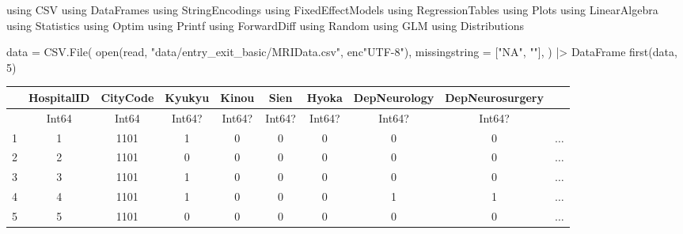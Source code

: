 \documentclass[
  letterpaper,
  DIV=11,
  numbers=noendperiod]{scrreprt}
\newenvironment{Shaded}{\begin{snugshade}}{\end{snugshade}}
\newcommand{\BuiltInTok}[1]{\textcolor[rgb]{0.00,0.23,0.31}{#1}}
\newcommand{\FloatTok}[1]{\textcolor[rgb]{0.68,0.00,0.00}{#1}}
\newcommand{\FunctionTok}[1]{\textcolor[rgb]{0.28,0.35,0.67}{#1}}
\newcommand{\ImportTok}[1]{\textcolor[rgb]{0.00,0.46,0.62}{#1}}
\newcommand{\NormalTok}[1]{\textcolor[rgb]{0.00,0.23,0.31}{#1}}
\newcommand{\OperatorTok}[1]{\textcolor[rgb]{0.37,0.37,0.37}{#1}}
\newcommand{\StringTok}[1]{\textcolor[rgb]{0.13,0.47,0.30}{#1}}
\begin{document}
\begin{Shaded}
\begin{Highlighting}[]
\ImportTok{using} \BuiltInTok{CSV}
\ImportTok{using} \BuiltInTok{DataFrames}
\ImportTok{using} \BuiltInTok{StringEncodings}
\ImportTok{using} \BuiltInTok{FixedEffectModels}
\ImportTok{using} \BuiltInTok{RegressionTables}
\ImportTok{using} \BuiltInTok{Plots}
\ImportTok{using} \BuiltInTok{LinearAlgebra}
\ImportTok{using} \BuiltInTok{Statistics}
\ImportTok{using} \BuiltInTok{Optim}
\ImportTok{using} \BuiltInTok{Printf}
\ImportTok{using} \BuiltInTok{ForwardDiff}
\ImportTok{using} \BuiltInTok{Random}
\ImportTok{using} \BuiltInTok{GLM}
\ImportTok{using} \BuiltInTok{Distributions}
\end{Highlighting}
\end{Shaded}

\begin{Shaded}
\begin{Highlighting}[]
\NormalTok{data }\OperatorTok{=}\NormalTok{ CSV.}\FunctionTok{File}\NormalTok{(}
    \FunctionTok{open}\NormalTok{(read, }\StringTok{"data/entry\_exit\_basic/MRIData.csv"}\NormalTok{, enc}\StringTok{"UTF{-}8"}\NormalTok{),}
\NormalTok{    missingstring }\OperatorTok{=}\NormalTok{ [}\StringTok{"NA"}\NormalTok{, }\StringTok{""}\NormalTok{],}
\NormalTok{    ) }\OperatorTok{|\textgreater{}}\NormalTok{ DataFrame}
\FunctionTok{first}\NormalTok{(data, }\FloatTok{5}\NormalTok{)}
\end{Highlighting}
\end{Shaded}

\begin{tabular}{r|ccccccccc}
    & HospitalID & CityCode & Kyukyu & Kinou & Sien & Hyoka & DepNeurology & DepNeurosurgery & \\
    \hline
    & Int64 & Int64 & Int64? & Int64? & Int64? & Int64? & Int64? & Int64? & \\
    \hline
    1 & 1 & 1101 & 1 & 0 & 0 & 0 & 0 & 0 & $\dots$ \\
    2 & 2 & 1101 & 0 & 0 & 0 & 0 & 0 & 0 & $\dots$ \\
    3 & 3 & 1101 & 1 & 0 & 0 & 0 & 0 & 0 & $\dots$ \\
    4 & 4 & 1101 & 1 & 0 & 0 & 0 & 1 & 1 & $\dots$ \\
    5 & 5 & 1101 & 0 & 0 & 0 & 0 & 0 & 0 & $\dots$ \\
\end{tabular}
\end{document}
